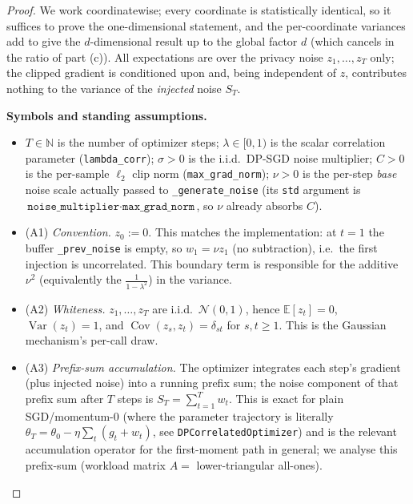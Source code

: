 \begin{proof}
We work coordinatewise; every coordinate is statistically identical, so it suffices to prove the one-dimensional statement, and the per-coordinate variances add to give the $d$-dimensional result up to the global factor $d$ (which cancels in the ratio of part (c)). All expectations are over the privacy noise $z_1,\dots,z_T$ only; the clipped gradient is conditioned upon and, being independent of $z$, contributes nothing to the variance of the \emph{injected} noise $S_T$.

\par\smallskip\noindent\textbf{Symbols and standing assumptions.}\quad 
\begin{itemize}
\item $T\in\mathbb N$ is the number of optimizer steps; $\lambda\in[0,1)$ is the scalar correlation parameter (\texttt{lambda\_corr}); $\sigma>0$ is the i.i.d.\ DP-SGD noise multiplier; $C>0$ is the per-sample $\ell_2$ clip norm (\texttt{max\_grad\_norm}); $\nu>0$ is the per-step \emph{base} noise scale actually passed to \texttt{\_generate\_noise} (its \texttt{std} argument is $\texttt{noise\_multiplier}\cdot\texttt{max\_grad\_norm}$, so $\nu$ already absorbs $C$).
\item (A1) \emph{Convention.} $z_0:=0$. This matches the implementation: at $t=1$ the buffer \texttt{\_prev\_noise} is empty, so $w_1=\nu z_1$ (no subtraction), i.e.\ the first injection is uncorrelated. This boundary term is responsible for the additive $\nu^2$ (equivalently the $\frac{1}{1-\lambda^2}$) in the variance.
\item (A2) \emph{Whiteness.} $z_1,\dots,z_T$ are i.i.d.\ $\mathcal N(0,1)$, hence $\mathbb E[z_t]=0$, $\operatorname{Var}(z_t)=1$, and $\operatorname{Cov}(z_s,z_t)=\delta_{st}$ for $s,t\ge1$. This is the Gaussian mechanism's per-call draw.
\item (A3) \emph{Prefix-sum accumulation.} The optimizer integrates each step's gradient (plus injected noise) into a running prefix sum; the noise component of that prefix sum after $T$ steps is $S_T=\sum_{t=1}^T w_t$. This is exact for plain SGD/momentum-$0$ (where the parameter trajectory is literally $\theta_T=\theta_0-\eta\sum_t(g_t+w_t)$, see \texttt{DPCorrelatedOptimizer}) and is the relevant accumulation operator for the first-moment path in general; we analyse this prefix-sum (workload matrix $A=$ lower-triangular all-ones).
\end{itemize}


\end{proof}
